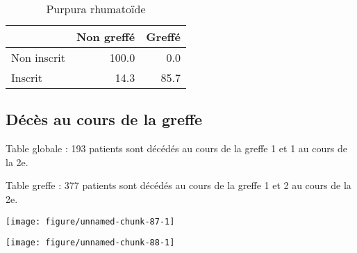 \documentclass[11pt,a4paper]{article}\usepackage[]{graphicx}\usepackage[]{color}
\makeatletter
\def\maxwidth{ %
  \ifdim\Gin@nat@width>\linewidth
    \linewidth
  \else
    \Gin@nat@width
  \fi
}
\newenvironment{knitrout}{}{} %
\makeatother
\begin{document}
\begin{table}[H]
\centering
\begin{tabular}{lrr}
  \hline
 & Non greffé & Greffé \\ 
  \hline
Non inscrit & 100.0 & 0.0 \\ 
  Inscrit & 14.3 & 85.7 \\ 
   \hline
\end{tabular}
\caption{Purpura rhumatoïde} 
\end{table}



  \subsection{Décès au cours de la greffe}

Table globale : 193 patients sont décédés au cours de la greffe 1 et 1 au cours de la 2e.

Table greffe : 377 patients sont décédés au cours de la greffe 1 et 2 au cours de la 2e.

\begin{knitrout}
\color{fgcolor}
\texttt{[image: figure/unnamed-chunk-87-1]} 

\end{knitrout}

\begin{knitrout}
\color{fgcolor}
\texttt{[image: figure/unnamed-chunk-88-1]} 

\end{knitrout}
\end{document}
